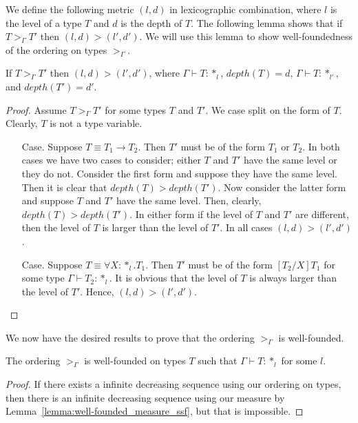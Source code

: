 We define the following metric $(l,d)$ in lexicographic combination,
where $l$ is the level of a type $T$ and $d$ is the depth of
$T$.  The following lemma shows that if $T >_\Gamma T'$ then
$(l,d) > (l',d')$.  We will use this lemma to show well-foundedness of
the ordering on types $>_\Gamma$.  

\begin{lemma}
  \label{lemma:well-founded_measure_ssf}
  If $T >_\Gamma T'$ then $(l,d) > (l',d')$, where $\Gamma \vdash T:*_l$, 
  $depth(T) = d$,  $\Gamma \vdash T:*_{l'}$, and $depth(T') = d'$.
\end{lemma}
\begin{proof}
  Assume $T >_\Gamma T'$ for some types $T$ and $T'$.  We case split on
  the form of $T$.  Clearly, $T$ is not a type variable.
  \begin{itemize}
  \item[Case.]  Suppose $T \equiv T_1 \to T_2$.  Then $T'$ must be of the 
    form $T_1$ or $T_2$.  In both
    cases we have two cases to
    consider; either $T$ and $T'$ have the same level or they do not.  Consider the
    first form and suppose they have the same level.  Then it is clear that 
    $depth(T) > depth(T')$.  Now consider the latter form and suppose
    $T$ and $T'$ have the same level.  Then, clearly, $depth(T) > depth(T')$.  
    In either form if the level of $T$ and $T'$ are different, then the level of 
    $T$ is larger than the level of $T'$.  In all cases $(l,d) > (l',d')$.
    
  \item[Case.] Suppose $T \equiv \forall X:*_l.T_1$.  Then $T'$ must be of the
    form $[T_2/X]T_1$ for some type $\Gamma \vdash T_2:*_l$.  It is obvious that
    the level of $T$ is always larger than the level of $T'$.  Hence, $(l,d) > (l',d')$.
  \end{itemize}
\end{proof}
\noindent We now have the desired results to prove that the ordering $>_\Gamma$ is 
well-founded.

\begin{thm}
  The ordering $>_\Gamma$ is well-founded on types $T$ such that 
  $\Gamma \vdash T:*_l$ for some $l$.
  \label{thm:well-founded_ordering_ssf}
\end{thm}
\begin{proof}
  If there exists a infinite decreasing sequence using our ordering on types,
  then there is an infinite decreasing sequence using our measure by 
  Lemma~\ref{lemma:well-founded_measure_ssf}, but that is impossible.
\end{proof}

